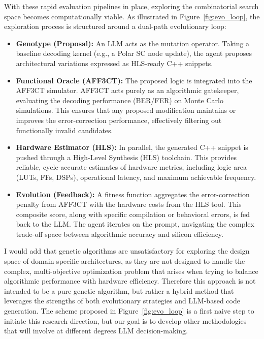 \documentclass[11pt]{report}
\begin{document}
With these rapid evaluation pipelines in place, exploring the combinatorial search space becomes computationally viable. As illustrated in Figure~\ref{fig:evo_loop}, the exploration process is structured around a dual-path evolutionary loop:
\begin{itemize}
    \item \textbf{Genotype (Proposal):} An LLM acts as the mutation operator. Taking a baseline decoding kernel (e.g., a Polar SC node update), the agent proposes architectural variations expressed as HLS-ready C++ snippets.
    \item \textbf{Functional Oracle (AFF3CT):} The proposed logic is integrated into the AFF3CT simulator. AFF3CT acts purely as an algorithmic gatekeeper, evaluating the decoding performance (BER/FER) on Monte Carlo simulations. This ensures that any proposed modification maintains or improves the error-correction performance, effectively filtering out functionally invalid candidates.
    \item \textbf{Hardware Estimator (HLS):} In parallel, the generated C++ snippet is pushed through a High-Level Synthesis (HLS) toolchain. This provides reliable, cycle-accurate estimates of hardware metrics, including logic area (LUTs, FFs, DSPs), operational latency, and maximum achievable frequency.
    \item \textbf{Evolution (Feedback):} A fitness function aggregates the error-correction penalty from AFF3CT with the hardware costs from the HLS tool. This composite score, along with specific compilation or behavioral errors, is fed back to the LLM. The agent iterates on the prompt, navigating the complex trade-off space between algorithmic accuracy and silicon efficiency.
\end{itemize}

I would add that genetic algorithms are unsatisfactory for exploring the design space of domain-specific architectures, as they are not designed to handle the complex, multi-objective optimization problem that arises when trying to balance algorithmic performance with hardware efficiency. Therefore this approach is not intended to be a pure genetic algorithm, but rather a hybrid method that leverages the strengths of both evolutionary strategies and LLM-based code generation. The scheme proposed in Figure~\ref{fig:evo_loop} is a first naive step to initiate this research direction, but our goal is to develop other methodologies that will involve at different degrees LLM decision-making.
\end{document}
